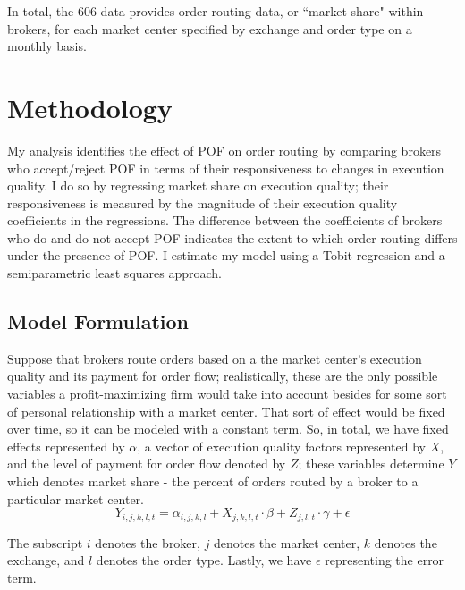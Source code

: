\documentclass[12pt,a4paper]{article}
\begin{document}
		In total, the 606 data provides order routing data, or ``market share" within brokers, for each market center specified by exchange and order type on a monthly basis. 


	

\section{Methodology}

	My analysis identifies the effect of POF on order routing by comparing brokers who accept/reject POF in terms of their responsiveness to changes in execution quality. I do so by regressing market share on execution quality; their responsiveness is measured by the magnitude of their execution quality coefficients in the regressions. The difference between the coefficients of brokers who do and do not accept POF indicates the extent to which order routing differs under the presence of POF. I estimate my model using a Tobit regression and a semiparametric least squares approach. 

	\subsection{Model Formulation}

	Suppose that brokers route orders based on a the market center's execution quality and its payment for order flow; realistically, these are the only possible variables a profit-maximizing firm would take into account besides for some sort of personal relationship with a market center. That sort of effect would be fixed over time, so it can be modeled with a constant term. So, in total, we have fixed effects represented by $\alpha$, a vector of execution quality factors represented by $X$, and the level of payment for order flow denoted by $Z$; these variables determine $Y$ which denotes market share - the percent of orders routed by a broker to a particular market center. 
	\begin{equation}
	Y_{i, j, k, l, t} = \alpha_{i,j,k,l} +  X_{j, k, l, t} \cdot \beta +   Z_{j, l, t} \cdot \gamma + \epsilon
	\end{equation}	
	
	The subscript $i$ denotes the broker, $j$ denotes the market center, $k$ denotes the exchange, and $l$ denotes the order type. Lastly, we have $\epsilon$ representing the error term.
	
\end{document}
